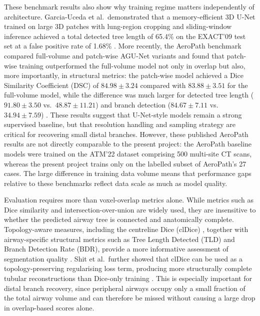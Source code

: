 \documentclass[11pt,a4paper]{article}
\begin{document}
These benchmark results also show why training regime matters independently of architecture. Garcia-Uceda et al.\ demonstrated that a memory-efficient 3D U-Net trained on large 3D patches with lung-region cropping and sliding-window inference achieved a total detected tree length of 65.4\% on the EXACT'09 test set at a false positive rate of 1.68\% \cite{GarciaUceda2021AirwayCNN}. More recently, the AeroPath benchmark compared full-volume and patch-wise AGU-Net variants and found that patch-wise training outperformed the full-volume model not only in overlap but also, more importantly, in structural metrics: the patch-wise model achieved a Dice Similarity Coefficient (DSC) of $84.98 \pm 3.24$ compared with $83.88 \pm 3.51$ for the full-volume model, while the difference was much larger for detected tree length ($91.80 \pm 3.50$ vs.\ $48.87 \pm 11.21$) and branch detection ($84.67 \pm 7.11$ vs.\ $34.94 \pm 7.59$) \cite{Stoverud2024AeroPath}. These results suggest that U-Net-style models remain a strong supervised baseline, but that resolution handling and sampling strategy are critical for recovering small distal branches. However, these published AeroPath results are not directly comparable to the present project: the AeroPath baseline models were trained on the ATM'22 dataset comprising 500 multi-site CT scans, whereas the present project trains only on the labelled subset of AeroPath's 27 cases. The large difference in training data volume means that performance gaps relative to these benchmarks reflect data scale as much as model quality.

Evaluation requires more than voxel-overlap metrics alone. While metrics such as Dice similarity and intersection-over-union are widely used, they are insensitive to whether the predicted airway tree is connected and anatomically complete. Topology-aware measures, including the centreline Dice (clDice) \cite{Shit2021clDice}, together with airway-specific structural metrics such as Tree Length Detected (TLD) and Branch Detection Rate (BDR), provide a more informative assessment of segmentation quality \cite{Stoverud2024AeroPath,GarciaUceda2021AirwayCNN,Li2022TreelikeReview}. Shit et al.\ further showed that clDice can be used as a topology-preserving regularising loss term, producing more structurally complete tubular reconstructions than Dice-only training \cite{Shit2021clDice}. This is especially important for distal branch recovery, since peripheral airways occupy only a small fraction of the total airway volume and can therefore be missed without causing a large drop in overlap-based scores alone.
\end{document}

